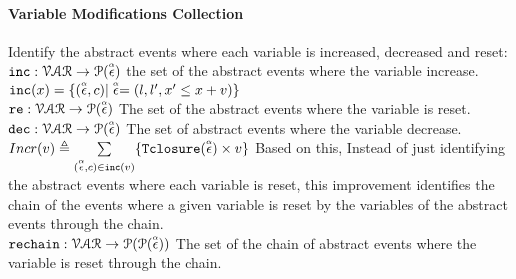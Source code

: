 \paragraph*{Variable Modifications Collection}
Identify the abstract events where each variable is increased, decreased and reset:
\\
$\mathtt{inc}: \mathcal{VAR} \to \mathcal{P}(\stackrel{\scriptscriptstyle{\alpha}}{\mathtt{\epsilon}{}}) $
the set of the abstract events where the variable increase.
\\
$\mathtt{inc}(x) = \{(\stackrel{\scriptscriptstyle{\alpha}}{\mathtt{\epsilon}{}}, c) | \stackrel{\scriptscriptstyle{\alpha}}{\mathtt{\epsilon}{}} = (l, l', x' \leq x + v)\}$
\\
$\mathtt{re}: \mathcal{VAR} \to \mathcal{P}(\stackrel{\scriptscriptstyle{\alpha}}{\mathtt{\epsilon}{}}) $
The set of the abstract events where the variable is reset.
\\
$\mathtt{dec}: \mathcal{VAR} \to \mathcal{P}(\stackrel{\scriptscriptstyle{\alpha}}{\mathtt{\epsilon}{}}) $
The set of abstract events where the variable decrease.
\\
$Incr(v) \triangleq \sum\limits_{(\stackrel{\scriptscriptstyle{\alpha}}{\mathtt{\epsilon}{}}, c) \in \mathtt{inc}(v)}\{{\mathtt{Tclosure}}(\stackrel{\scriptscriptstyle{\alpha}}{\mathtt{\epsilon}{}}) \times v\}$
%
Based on this, 
Instead of just identifying the abstract events where each variable is reset,
this improvement identifies the chain of the events where a given variable is reset by the 
variables of the abstract events through the chain.
\\
$\mathtt{rechain}: \mathcal{VAR} \to \mathcal{P}(\mathcal{P}(\stackrel{\scriptscriptstyle{\alpha}}{\mathtt{\epsilon}{}})) $
The set of the chain of abstract events where the variable is reset through the chain.
%

